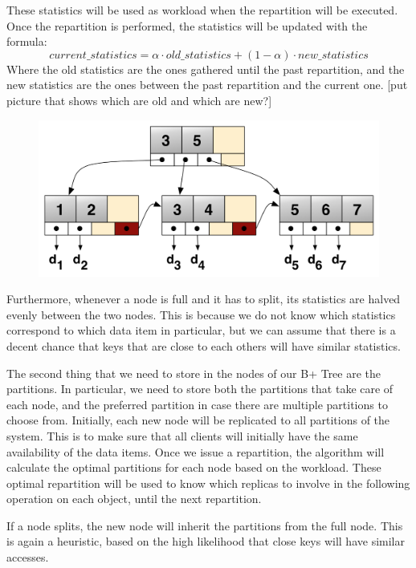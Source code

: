 These statistics will be used as workload when the repartition will be executed. Once the repartition is performed, the statistics will be updated with the formula:
$$ current\_statistics = \alpha \cdot old\_statistics + (1-\alpha) \cdot new\_statistics $$
Where the old statistics are the ones gathered until the past repartition, and the new statistics are the ones between the past repartition and the current one.
[put picture that shows which are old and which are new?]
\begin{figure}[!htb]
  \centering
  \includegraphics[width=\textwidth,height=\textheight,keepaspectratio]{img/b+tree.png}
  \caption[caption]{ }
  \label{fig:b+tree}
\end{figure}

Furthermore, whenever a node is full and it has to split, its statistics are halved evenly between the two nodes. This is because we do not know which statistics correspond to which data item in particular, but we can assume that there is a decent chance that keys that are close to each others will have similar statistics.

The second thing that we need to store in the nodes of our B+ Tree are the partitions. In particular, we need to store both the partitions that take care of each node, and the preferred partition in case there are multiple partitions to choose from. Initially, each new node will be replicated to all partitions of the system. This is to make sure that all clients will initially have the same availability of the data items. Once we issue a repartition, the algorithm will calculate the optimal partitions for each node based on the workload. These optimal repartition will be used to know which replicas to involve in the following operation on each object, until the next repartition. 

If a node splits, the new node will inherit the partitions from the full node. This is again a heuristic, based on the high likelihood that close keys will have similar accesses.

